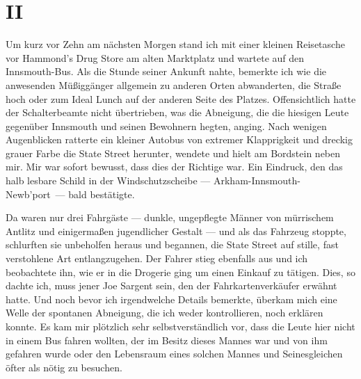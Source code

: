 \chapter*{II}

Um kurz vor Zehn am nächsten Morgen stand ich mit einer kleinen Reisetasche vor Hammond's Drug Store am alten Marktplatz und wartete auf den Innsmouth-Bus. Als die Stunde seiner Ankunft nahte, bemerkte ich wie die anwesenden Müßiggänger allgemein zu anderen Orten abwanderten, die Straße hoch oder zum Ideal Lunch auf der anderen Seite des Platzes. Offensichtlich hatte der Schalterbeamte nicht übertrieben, was die Abneigung, die die hiesigen Leute gegenüber Innsmouth und seinen Bewohnern hegten, anging. Nach wenigen Augenblicken ratterte ein kleiner Autobus von extremer Klapprigkeit und dreckig grauer Farbe die State Street herunter, wendete und hielt am Bordstein neben mir. Mir war sofort bewusst, dass dies der Richtige war. Ein Eindruck, den das halb lesbare Schild in der Windschutzscheibe --- \glqq Arkham-Innsmouth-Newb'port\grqq\ --- bald bestätigte.

Da waren nur drei Fahrgäste --- dunkle, ungepflegte Männer von mürrischem Antlitz und einigermaßen jugendlicher Gestalt --- und als das Fahrzeug stoppte, schlurften sie unbeholfen heraus und begannen, die State Street auf stille, fast verstohlene Art entlangzugehen. Der Fahrer stieg ebenfalls aus und ich beobachtete ihn, wie er in die Drogerie ging um einen Einkauf zu tätigen. Dies, so dachte ich, muss jener Joe Sargent sein, den der Fahrkartenverkäufer erwähnt hatte. Und noch bevor ich irgendwelche Details bemerkte, überkam mich eine Welle der spontanen Abneigung, die ich weder kontrollieren, noch erklären konnte. Es kam mir plötzlich sehr selbstverständlich vor, dass die Leute hier nicht in einem Bus fahren wollten, der im Besitz dieses Mannes war und von ihm gefahren wurde oder den Lebensraum eines solchen Mannes und Seinesgleichen öfter als nötig zu besuchen.

